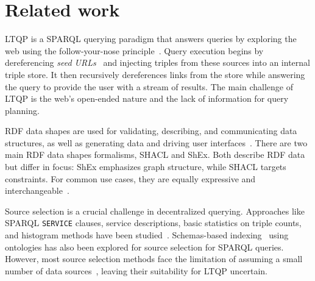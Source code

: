 \section{Related work}

LTQP is a SPARQL querying paradigm that answers queries by exploring the web using the follow-your-nose principle~\cite{hartig2016walking}.
Query execution begins by dereferencing \emph{seed URLs}~\cite{hartig2016walking} and injecting triples from these sources into an internal triple store.
It then recursively dereferences links from the store while answering the query to provide the user with a stream of results.
The main challenge of LTQP is the web's open-ended nature and the lack of information for query planning.

RDF data shapes are used for validating, describing, and communicating data structures, as well as generating data and driving user interfaces~\cite{Gayo2018a,Gayo2018}.
There are two main RDF data shapes formalisms, SHACL and ShEx.
Both describe RDF data but differ in focus: ShEx emphasizes graph structure, while SHACL targets constraints.
For common use cases, they are equally expressive and interchangeable~\cite{Gayo2018c}.

Source selection is a crucial challenge in decentralized querying.
Approaches like SPARQL \texttt{SERVICE} clauses, service descriptions, basic statistics on triple counts, and histogram methods have been studied~\cite{hose2012towards, Harth2010}.
Schemas-based indexing~\cite{Stuckenschmidt2004} using ontologies has also been explored for source selection for SPARQL queries. 
However, most source selection methods face the limitation of assuming a small number of data sources~\cite{Harth2010}, leaving their suitability for LTQP uncertain.

